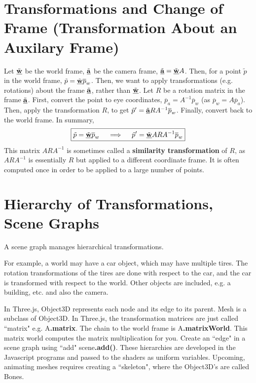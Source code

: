 \documentclass[letterpaper,12pt]{article}
\begin{document}
\section*{Transformations and Change of Frame (Transformation About an Auxilary Frame)}
Let $\tilde{\underline{\mathbf{w}}}$ be the world frame, $\tilde{\underline{\mathbf{a}}}$ be the camera frame, $\tilde{\underline{\mathbf{a}}} = \tilde{\underline{\mathbf{w}}} A$. Then, for a point $\tilde{p}$ in the world frame, $\tilde{p} = \tilde{\underline{\mathbf{w}}} \overline{p}_w$. Then, we want to apply transformations (e.g. rotations) about the frame $\tilde{\underline{\mathbf{a}}}$, rather than $\tilde{\underline{\mathbf{w}}}$. Let $R$ be a rotation matrix in the frame $\tilde{\underline{\mathbf{a}}}$. First, convert the point to eye coordinates, $\overline{p}_a = A^{-1} \overline{p}_w$ (as $\overline{p}_w = A \overline{p}_a$). Then, apply the transformation $R$, to get $\tilde{p}' = \tilde{\underline{\mathbf{a}}} RA^{-1} \overline{p}_w$. Finally, convert back to the world frame. In summary,
\begin{equation*}
    \boxed{\tilde{p} = \tilde{\underline{\mathbf{w}}} \overline{p}_w \quad \implies \quad \tilde{p}' = \tilde{\underline{\mathbf{w}}} ARA^{-1} \overline{p}_w}
\end{equation*}
This matrix $ARA^{-1}$ is sometimes called a \textbf{similarity transformation} of $R$, as $ARA^{-1}$ is essentially $R$ but applied to a different coordinate frame. It is often computed once in order to be applied to a large number of points.

\section*{Hierarchy of Transformations, Scene Graphs}
A scene graph manages hierarchical transformations. 

\begin{example}
For example, a world may have a car object, which may have multiple tires. The rotation transformations of the tires are done with respect to the car, and the car is transformed with respect to the world. Other objects are included, e.g. a building, etc. and also the camera.
\end{example}

In Three.js, Object3D represents each node and its edge to its parent. Mesh is a subclass of Object3D. In Three.js, the transformation matrices are just called ``matrix" e.g. A\textbf{.matrix}. The chain to the world frame is A\textbf{.matrixWorld}. This matrix world computes the matrix multiplication for you. Create an ``edge" in a scene graph using ``add" scene\textbf{.add()}. These hierarchies are developed in the Javascript programs and passed to the shaders as uniform variables. Upcoming, animating meshes requires creating a ``skeleton", where the Object3D's are called Bones.
\end{document}
